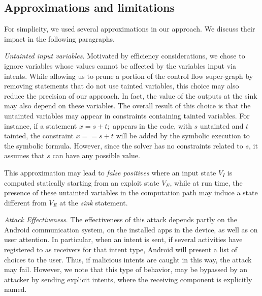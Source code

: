 

\subsection{Approximations and limitations}

For simplicity, we used several approximations in our approach. We discuss their impact in the following paragraphs.

\emph{Untainted input variables}. Motivated by efficiency considerations, we chose to ignore variables whose values cannot be affected by the variables input via intents. While allowing us to prune a portion of the control flow super-graph by removing statements that do not use tainted variables, this choice may also reduce the precision of our approach. In fact, the value of the outputs at the sink may also depend on these variables. {\color{orange} The overall result of this choice is that the untainted variables may appear in constraints containing tainted variables. For instance, if a statement $x=s+t;$ appears in the code, with $s$ untainted and $t$ tainted, the constraint $x==s+t$ will be added by the symbolic execution to the symbolic formula. However, since the solver has no constraints related to $s$, it assumes that $s$ can have any possible value.} 

This approximation may lead to \textit{false positives} where an input state $V_I$ is computed statically starting from an exploit state $V_E$, while at run time, the presence of these untainted variables in the computation path may induce a state different from $V_E$ at the \textit{sink} statement.

{\color{orange}
\emph{Attack Effectiveness}. The effectiveness of this attack depends partly on the Android communication system, on the installed apps in the device, as well as on user attention. In particular, when an intent is sent, if several activities have registered to as receivers for that intent type, Android will present a list of choices to the user. Thus, if malicious intents are caught in this way, the attack may fail. However, we note that this type of behavior, may be bypassed by an attacker by sending explicit intents, where the receiving component is explicitly named.}



